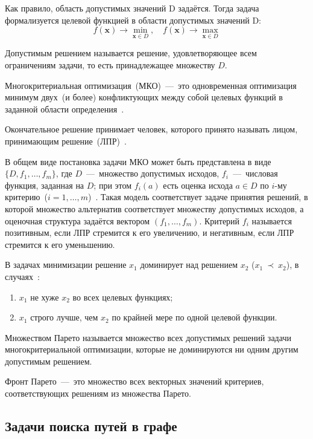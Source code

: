 Как правило, область допустимых значений D задаётся. Тогда задача формализуется целевой функцией в области допустимых значений D:
\begin{equation}
    f(\mathbf{x}) \to \min_{\mathbf{x} \in D}, \quad f(\mathbf{x}) \to \max_{\mathbf{x} \in D}
\end{equation}

Допустимым решением называется решение, удовлетворяющее всем ограничениям задачи, то есть принадлежащее множеству \(D\).

Многокритериальная оптимизация~(МКО)~---~это одновременная оптимизация минимум двух~(и более) конфликтующих между собой целевых функций в заданной области определения~\cite{khmelevski2024realestate}.

Окончательное решение принимает человек, которого принято называть лицом, принимающим решение~(ЛПР)~\cite{khmelevski2024realestate}. 

В общем виде постановка задачи МКО может быть представлена в виде \(\{D, f_1, \ldots, f_m\}\), где \(D\)~---~множество допустимых исходов, \(f_i\)~---~числовая функция, заданная на \(D\); при этом \(f_i(a)\) есть оценка исхода \(a \in D\) по \(i\)-му критерию~(\(i = 1, \ldots, m\))~\cite{khmelevski2024realestate}. Такая модель соответствует задаче принятия решений, в которой множество альтернатив соответствует множеству допустимых исходов, а оценочная структура задаётся вектором \((f_1, \ldots, f_m)\). Критерий \(f_i\) называется позитивным, если ЛПР стремится к его увеличению, и негативным, если ЛПР стремится к его уменьшению.

В задачах минимизации решение \(x_1\) доминирует над решением \(x_2\) (\(x_1~\prec~x_2\)), в случаях~\cite{polkovnikova2024evo}: 
\begin{enumerate}
	\item \(x_1\) не хуже \(x_2\) во всех целевых функциях;
	\item \(x_1\) строго лучше, чем \(x_2\) по крайней мере по одной целевой функции.
\end{enumerate}

Множеством Парето называется множество всех допустимых решений задачи многокритериальной оптимизации, которые не доминируются ни одним другим допустимым решением.

Фронт Парето~---~это множество всех векторных значений критериев, соответствующих решениям из множества Парето.

\subsection{Задачи поиска путей в графе}

